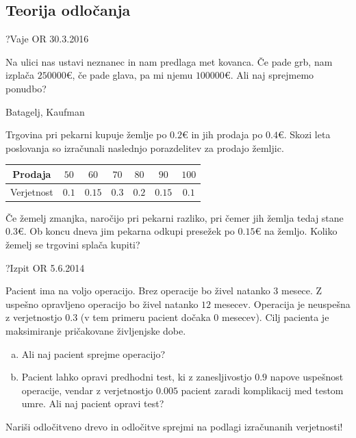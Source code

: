 \subsection{Teorija odločanja}

\begin{naloga}{?}{Vaje OR 30.3.2016}
\begin{vprasanje}
Na ulici nas ustavi neznanec in nam predlaga met kovanca.
Če pade grb, nam izplača $250000 €$,
če pade glava, pa mi njemu $100000 €$.
Ali naj sprejmemo ponudbo?

\end{vprasanje}
\begin{odgovor}
\end{odgovor}
\end{naloga}


\begin{naloga}{Batagelj, Kaufman}{\cite[Naloga~4.2]{bk}}
\begin{vprasanje}
Trgovina pri pekarni kupuje žemlje po $0.2 €$
in jih prodaja po $0.4 €$.
Skozi leta poslovanja so izračunali naslednjo porazdelitev za prodajo žemljic.
\begin{center}
\begin{tabular}{c|cccccc}
Prodaja & $50$ & $60$ & $70$ & $80$ & $90$ & $100$ \\
\hline
Verjetnost & $0.1$ & $0.15$ & $0.3$ & $0.2$ & $0.15$ & $0.1$
\end{tabular}
\end{center}
Če žemelj zmanjka, naročijo pri pekarni razliko,
pri čemer jih žemlja tedaj stane $0.3 €$.
Ob koncu dneva jim pekarna odkupi presežek po $0.15 €$ na žemljo.
Koliko žemelj se trgovini splača kupiti?

\end{vprasanje}
\begin{odgovor}
\end{odgovor}
\end{naloga}


\begin{naloga}{?}{Izpit OR 5.6.2014}
\begin{vprasanje}
Pacient ima na voljo operacijo.
Brez operacije bo živel natanko $3$ mesece.
Z uspešno opravljeno operacijo bo živel natanko $12$ mesecev.
Operacija je neuspešna z verjetnostjo $0.3$
(v tem primeru pacient dočaka $0$ mesecev).
Cilj pacienta je maksimiranje pričakovane življenjske dobe.
\begin{enumerate}[(a)]
\item Ali naj pacient sprejme operacijo?
\item Pacient lahko opravi predhodni test,
ki z zanesljivostjo $0.9$ napove uspeš\-nost operacije,
vendar z verjetnostjo $0.005$ pacient zaradi komplikacij med testom umre.
Ali naj pacient opravi test?
\end{enumerate}
Nariši odločitveno drevo
in odločitve sprejmi na podlagi izračunanih ve\-rjet\-no\-sti!
\end{vprasanje}
\begin{odgovor}
\end{odgovor}
\end{naloga}


